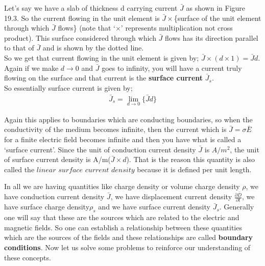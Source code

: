 Let's say we have a slab of thickness d carrying current $\bar{J}$ as shown in Figure 19.3. So the current flowing in the unit element is $\bar{J}\times$\{surface of the unit element through which $\bar{J}$ flows\} (note that `$\times$' represents multiplication not cross product).
This surface considered through which $\bar{J}$ flows has its direction parallel to that of $\bar{J}$ and is shown by the dotted line.\\ 
So we get that current flowing in the unit element is given by; $\bar{J}\times(d\times1)=\bar{J}d$. Again if we make $d\rightarrow0$ and $\bar{J}$ goes to infinity, you will have a current truly flowing on the surface and that current is the \textbf{surface current} $\bar{J}_{s}$. \\
So essentially surface current is given by;
\begin{align}
	\bar{J}_{s}=\lim_{d\rightarrow0}\{\bar{J}d\}
\end{align}


Again this applies to boundaries which are conducting boundaries, so when the conductivity of the medium becomes infinite, then the current which is $\bar{J}=\sigma\bar{E}$ for a finite electric field becomes infinite and then you have what is called a `surface current'. Since the unit of conduction current density $\bar{J}$ is $A/m^{2}$, the unit of surface current density is A/m($\bar{J}\times d$). That is the reason this quantity is also called the $linear$ $surface$ $current$ $density$ because it is defined per unit length.


In all we are having quantities like charge density or volume charge density $\rho$, we have conduction current density $\bar{J}$, we have displacement current density $\frac{\partial\bar{D}}{\partial t}$, we have surface charge density$\rho_{s}$ and we have surface current density $\bar{J}_{s}$. Generally one will say that these are the sources which are related to the electric and magnetic fields. So one can establish a relationship between these quantities which are the sources of the fields and these relationships are called \textbf{ boundary conditions}. Now let us solve some problems to reinforce our understanding of these concepts.

